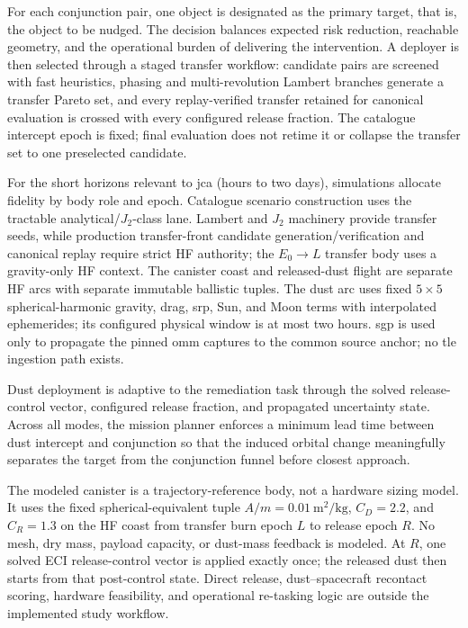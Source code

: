     For each conjunction pair, one object is designated as the primary target, that is, the object to be nudged. The decision balances expected risk reduction, reachable geometry, and the operational burden of delivering the intervention. A deployer is then selected through a staged transfer workflow: candidate pairs are screened with fast heuristics, phasing and multi-revolution Lambert branches generate a transfer Pareto set, and every replay-verified transfer retained for canonical evaluation is crossed with every configured release fraction. The catalogue intercept epoch is fixed; final evaluation does not retime it or collapse the transfer set to one preselected candidate.

    For the short horizons relevant to \gls{jca} (hours to two days), simulations allocate fidelity by body role and epoch. Catalogue scenario construction uses the tractable analytical/\(J_2\)-class lane. Lambert and \(J_2\) machinery provide transfer seeds, while production transfer-front candidate generation/verification and canonical replay require strict HF authority; the \(E_0\rightarrow L\) transfer body uses a gravity-only HF context. The canister coast and released-dust flight are separate HF arcs with separate immutable ballistic tuples. The dust arc uses fixed \(5\times5\) spherical-harmonic gravity, drag, \gls{srp}, Sun, and Moon terms with interpolated ephemerides; its configured physical window is at most two hours. \Gls{sgp} is used only to propagate the pinned \gls{omm} captures to the common source anchor; no \gls{tle} ingestion path exists.

    Dust deployment is adaptive to the remediation task through the solved release-control vector, configured release fraction, and propagated uncertainty state. Across all modes, the mission planner enforces a minimum lead time between dust intercept and conjunction so that the induced orbital change meaningfully separates the target from the conjunction funnel before closest approach.

    The modeled canister is a trajectory-reference body, not a hardware sizing model. It uses the fixed spherical-equivalent tuple \(A/m=0.01~\si{\metre\squared\per\kilogram}\), \(C_D=2.2\), and \(C_R=1.3\) on the HF coast from transfer burn epoch \(L\) to release epoch \(R\). No mesh, dry mass, payload capacity, or dust-mass feedback is modeled. At \(R\), one solved ECI release-control vector is applied exactly once; the released dust then starts from that post-control state. Direct release, dust--spacecraft recontact scoring, hardware feasibility, and operational re-tasking logic are outside the implemented study workflow.

